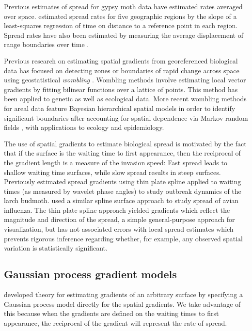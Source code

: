 \documentclass[12pt]{article}
\begin{document}
Previous estimates of spread for gypsy moth data have estimated rates averaged over space. \cite{liebhold1992gypsy} estimated spread rates for five geographic regions by the slope of a least-squares regression of time on distance to a reference point in each region. Spread rates have also been estimated by measuring the average displacement of range boundaries over time \citep{sharov1997methods,tobin2007comparison}.

Previous research on estimating spatial gradients from georeferenced biological data has focused on detecting zones or boundaries of rapid change across space using geostatistical {\it wombling} \citep{womble1951}. Wombling methods involve estimating local vector gradients by fitting bilinear functions over a lattice of points. This method has been applied to genetic \citep{barbujani1989detecting} as well as ecological \citep{fortin1994edge} data. More recent wombling methods for areal data feature Bayesian hierarchical spatial models in order to identify significant boundaries after accounting for spatial dependence via Markov random fields \citep{banerjee2004hierarchical,fitzpatrick2010,lu2007bayesian}, with applications to ecology and epidemiology.

The use of spatial gradients to estimate biological spread is motivated by the fact that if the surface is the waiting time to first appearance, then the reciprocal of the gradient length is a measure of the invasion speed: Fast spread leads to shallow waiting time surfaces, while slow spread results in steep surfaces. Previously \cite{johnson2004landscape} estimated spread gradients using thin plate spline applied to waiting times (as measured by wavelet phase angles) to study outbreak dynamics of the larch budmoth. \cite{farnsworth2009} used a similar spline surface approach to study spread of avian influenza. The thin plate spline approach yielded gradients which reflect the magnitude and direction of the spread, a simple general-purpose approach for visualization, but has not associated errors with local spread estimates which prevents rigorous inference regarding whether, for example, any observed spatial variation is statistically significant.

\subsection{Gaussian process gradient models} \label{sec:models}

\cite{banerjee2003directional} developed theory for estimating gradients of an arbitrary surface by specifying a Gaussian process model directly for the spatial gradients. We take advantage of this because when the gradients are defined on the waiting times to first appearance, the reciprocal of the gradient will represent the rate of spread.
\end{document}

